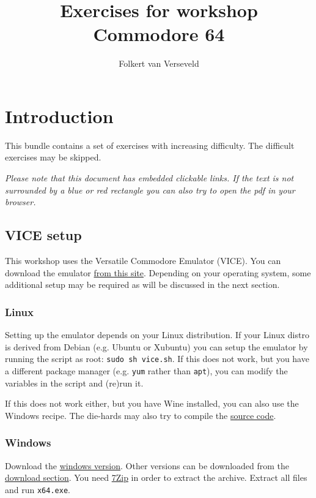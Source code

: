 \documentclass{article}
\title{Exercises for workshop Commodore 64}
\author{Folkert van Verseveld}
\begin{document}
\maketitle

\section{Introduction}

This bundle contains a set of exercises with increasing difficulty.
The difficult exercises may be skipped.

\emph{Please note that this document has embedded clickable links.
If the text is not surrounded by a blue or red rectangle you can also try to open the pdf in your browser.}

\subsection{VICE setup}
This workshop uses the Versatile Commodore Emulator (VICE).
You can download the emulator \href{http://vice-emu.sourceforge.net/}{from this site}.
Depending on your operating system, some additional setup may be required as will be discussed in the next section.

\subsubsection{Linux}
Setting up the emulator depends on your Linux distribution.
If your Linux distro is derived from Debian (e.g. Ubuntu or Xubuntu) you can setup the emulator by running the script as root:
\verb:sudo sh vice.sh:.
If this does not work, but you have a different package manager (e.g. \verb:yum: rather than \verb:apt:), you can modify the variables in the script and (re)run it.

If this does not work either, but you have Wine installed, you can also use the Windows recipe.
The die-hards may also try to compile the \href{http://sourceforge.net/projects/vice-emu/files/releases/vice-3.1.tar.gz/download}{source code}.

\subsubsection{Windows}
Download the \href{http://sourceforge.net/projects/vice-emu/files/releases/binaries/windows/WinVICE-3.1-x64.7z/download}{windows version}.
Other versions can be downloaded from the \href{http://vice-emu.sourceforge.net/windows.html}{download section}.
You need \href{http://www.7-zip.org/}{7Zip} in order to extract the archive.
Extract all files and run \verb:x64.exe:.
\end{document}
